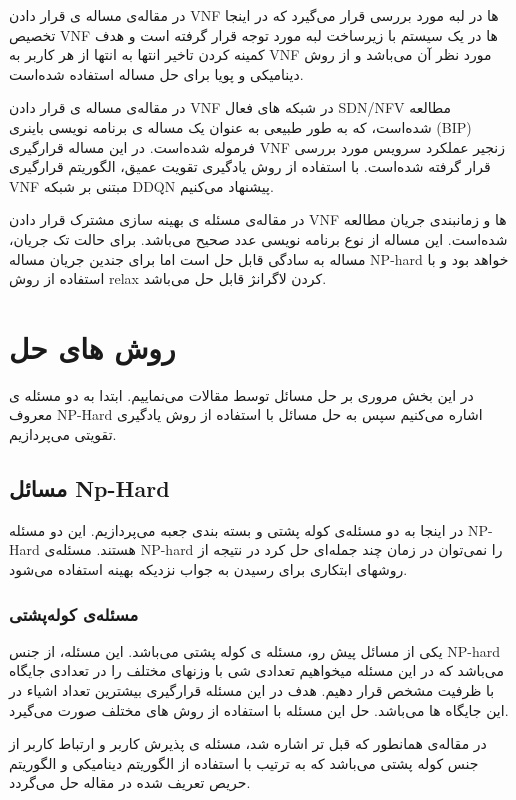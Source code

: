 در مقاله‌ی
\cite{cziva2018dynamic}
مساله ی قرار دادن VNF ها در لبه مورد بررسی قرار می‌گیرد که در اینجا تخصیص VNF ها در یک سیستم با زیرساخت لبه مورد توجه قرار گرفته است و هدف کمینه کردن تاخیر انتها به انتها از هر کاربر به VNF مورد نظر آن می‌باشد و از روش دینامیکی و پویا برای حل مساله استفاده شده‌است. 

در مقاله‌ی
\cite{pei2019optimal}
مساله ی قرار دادن VNF در شبکه های فعال SDN/NFV مطالعه شده‌است، که به طور طبیعی به عنوان یک مساله ی برنامه نویسی باینری (BIP) فرموله شده‌است. 
در این مساله قرارگیری VNF زنجیر عملکرد سرویس مورد بررسی قرار گرفته شده‌است. 
با استفاده از روش یادگیری تقویت عمیق، الگوریتم قرارگیری VNF مبتنی بر شبکه DDQN  پیشنهاد می‌کنیم.

در مقاله‌ی
\cite{ren2020joint}
 مسئله ی بهینه سازی مشترک قرار دادن VNF ها و زمانبندی جریان مطالعه شده‌است.
 این مساله از نوع برنامه نویسی عدد صحیح می‌باشد.
 برای حالت تک جریان، مساله به سادگی قابل حل است اما برای جندین جریان مساله
 NP-hard
 خواهد بود و با استفاده از روش relax کردن لاگرانژ
 قابل حل می‌باشد.
\section{روش های حل}
در این بخش مروری بر حل مسائل توسط مقالات می‌نماییم. 
ابتدا به دو مسئله ی معروف NP-Hard
اشاره می‌کنیم سپس به حل مسائل با استفاده از روش یادگیری تقویتی می‌پردازیم.
\subsection{مسائل Np-Hard}
در اینجا به دو مسئله‌ی کوله پشتی و بسته بندی جعبه می‌پردازیم. این دو مسئله NP-Hard هستند.
مسئله‌ی NP-hard را نمی‌توان در زمان چند جمله‌ای حل کرد در نتیجه از روشهای ابتکاری برای رسیدن به جواب نزدیکه بهینه استفاده می‌شود.
\subsubsection{ مسئله‌ی کوله‌پشتی }
یکی از مسائل پیش رو، مسئله ی کوله پشتی 
می‌باشد.
این مسئله، از جنس NP-hard
می‌باشد که در این مسئله میخواهیم تعدادی شی با وزنهای مختلف را در تعدادی جایگاه با ظرفیت مشخص قرار دهیم.
هدف در این مسئله قرارگیری بیشترین تعداد اشیاء در این جایگاه ها می‌باشد.
حل این مسئله با استفاده از روش های مختلف صورت می‌گیرد.

در مقاله‌ی \cite{lee2018dynamic}
همانطور که قبل تر اشاره شد، مسئله ی پذیرش کاربر و ارتباط کاربر از جنس کوله پشتی
 می‌باشد که به ترتیب با استفاده از الگوریتم دینامیکی و الگوریتم حریص تعریف شده در مقاله
 حل می‌گردد.

